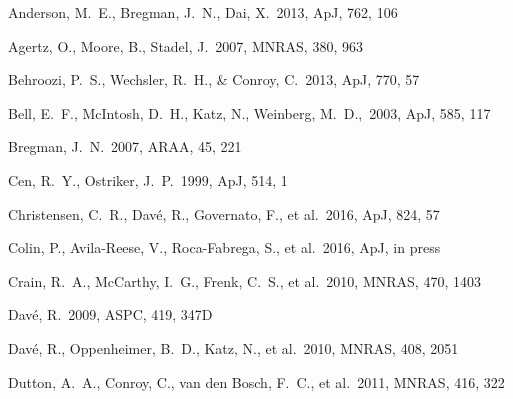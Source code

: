 \documentclass[useAMS,usenatbib]{mn2e}
\def \apj {ApJ}
\def \mnras {MNRAS}
\begin{document}
\begin{thebibliography}{}


 Anderson, M.~E., Bregman, J.~N., Dai, X.\ 2013, \apj, 762, 106

 Agertz, O., Moore, B., Stadel, J.\ 2007, \mnras, 380, 963


 Behroozi, P.~S.,
  Wechsler, R.~H., \& Conroy, C.\ 2013, \apj, 770, 57

 Bell, E.~F., McIntosh, D.~H., Katz, N., Weinberg, M.~D.,\ 2003, \apj, 585, 117

Bregman, J.~N.\ 2007, ARAA, 45, 221


Cen, R.~Y., Ostriker, J.~P.\ 1999, \apj, 514, 1

Christensen, C.~R., Dav{\'e}, R., Governato, F., et al.\ 2016, \apj, 824, 57

Colin, P., Avila-Reese, V., Roca-Fabrega, S., et al.\ 2016, \apj, in press

Crain, R.~A., McCarthy, I.~G., Frenk, C.~S., et al.\ 2010, \mnras, 470, 1403


 Dav{\'e}, R.\ 2009, ASPC, 419, 347D

 Dav{\'e}, R., Oppenheimer, B.~D., Katz, N., et al.\ 2010, \mnras, 408, 2051

 Dutton, A.~A., Conroy, 
  C., van den Bosch, F.~C., et al.\ 2011, \mnras, 416, 322
  

\end{thebibliography}
\end{document}
